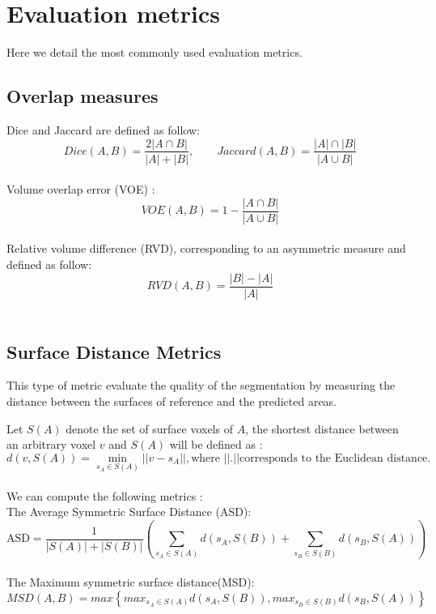\chapter{Evaluation metrics}\label{appendix---Evaluation Metrics}

Here we detail the most commonly used evaluation metrics.

\section{Overlap measures}

Dice and Jaccard are defined as follow:\\
\[Dice(A,B) = \frac{2\left| A \cap B \right|}{\left|A\right| + \left|B\right|},\qquad Jaccard(A,B) = \frac{ \left|A\right| \cap \left|B\right|}{ \left|A \cup B\right|}\]\\
Volume overlap error (VOE) :\\
\[VOE(A,B)= 1-\frac{\left|A \cap B\right|}{\left|A\cup B\right|}\] \\
Relative volume difference (RVD), corresponding to an asymmetric measure and defined as follow: \\
\[RVD(A,B)=\frac{\left|B\right|-\left|A\right|}{\left|A\right|}\] \\



\section{Surface Distance Metrics}

This type of metric evaluate the quality of the segmentation by measuring the distance between the surfaces of reference and the predicted areas.

Let $ S(A) $ denote the set of surface voxels of $ A $, the shortest distance between an arbitrary voxel $ v $ and $ S(A) $ will be defined as :\\
\[d(v, S(A)) = \min_{s_A \in S(A)} \left|\left| v - s_A \right|\right|, \text{where } \left|\left|.\right|\right| \text{corresponds to the Euclidean distance}.\] \\
We can compute the following metrics :\\
The Average Symmetric Surface Distance (ASD):\\
\[\text{ASD} = \frac{1}{\left|S(A)\right| + \left|S(B)\right|} \left( \sum_{s_A \in S(A)} d(s_A, S(B)) + \sum_{s_B \in S(B)} d(s_B, S(A)) \right)\] \\
The Maximum symmetric surface distance(MSD): \\
\[MSD(A,B)=max{\left\{{max}_{s_A \in S(A)} d(s_A, S(B)), {max}_{s_B \in S(B)} d(s_B, S(A))\right\}}\]
